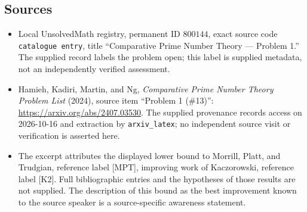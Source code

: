 \documentclass[11pt]{article}
\begin{document}
\subsection{Sources}
\begin{itemize}
\item Local UnsolvedMath registry, permanent ID \(800144\), exact source code \texttt{catalogue entry}, title ``Comparative Prime Number Theory --- Problem 1.'' The supplied record labels the problem open; this label is supplied metadata, not an independently verified assessment.
\item Hamieh, Kadiri, Martin, and Ng, \emph{Comparative Prime Number Theory Problem List} (2024), source item ``Problem 1 (\#13)'': \url{https://arxiv.org/abs/2407.03530}. The supplied provenance records access on 2026-10-16 and extraction by \texttt{arxiv\_latex}; no independent source visit or verification is asserted here.
\item The excerpt attributes the displayed lower bound to Morrill, Platt, and Trudgian, reference label [MPT], improving work of Kaczorowski, reference label [K2]. Full bibliographic entries and the hypotheses of those results are not supplied. The description of this bound as the best improvement known to the source speaker is a source-specific awareness statement.
\end{itemize}
\end{document}
